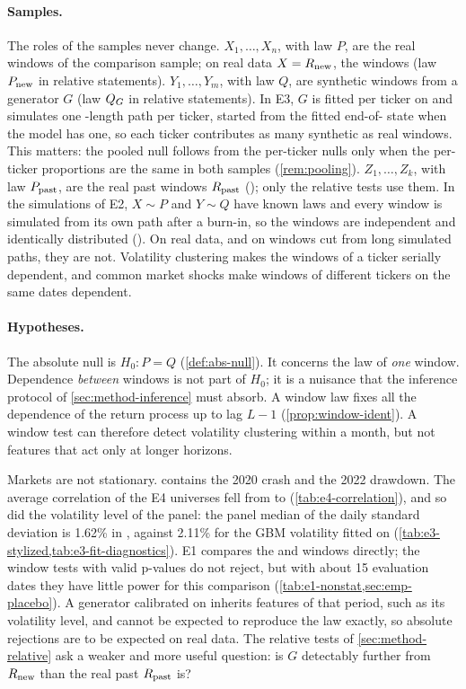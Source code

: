 \paragraph{Samples.}
The roles of the samples never change. $X_1,\dots,X_n$, with law $P$, are the real windows of
the comparison sample; on real data $X=R_{\mathrm{new}}$, the \TEST{} windows (law $P_{\mathrm{new}}$ in relative
statements). $Y_1,\dots,Y_m$, with law $Q$, are synthetic windows from a generator $G$ (law $Q_{G}$
in relative statements). In E3, $G$ is fitted per ticker on \TRAIN{} and simulates one
\TEST{}-length path per ticker, started from the fitted end-of-\TRAIN{} state when the model has
one, so each ticker contributes as many synthetic as real windows. This matters: the pooled null
follows from the per-ticker nulls only when the per-ticker proportions are the same in both
samples (\cref{rem:pooling}). $Z_1,\dots,Z_k$, with law $P_{\mathrm{past}}$, are the real past windows
$R_{\mathrm{past}}$ (\TRAIN{}); only the relative tests use them.
In the simulations of E2, $X\sim P$ and $Y\sim Q$ have known laws and every window is simulated
from its own path after a burn-in, so the windows are independent and identically distributed
(\iid{}). On real data, and on windows cut from long simulated paths, they are not. Volatility
clustering makes the windows of a ticker serially dependent, and common market shocks make
windows of different tickers on the same dates dependent.

\paragraph{Hypotheses.}
The absolute null is $H_0: P=Q$ (\cref{def:abs-null}). It concerns the law of \emph{one}
window. Dependence \emph{between} windows is not part of $H_0$; it is a nuisance that the
inference protocol of \cref{sec:method-inference} must absorb. A window law fixes all the
dependence of the return process up to lag $L-1$ (\cref{prop:window-ident}). A window test can
therefore detect volatility clustering within a month, but not features that act only at longer
horizons.

Markets are not stationary. \TRAIN{} contains the 2020 crash and the 2022 drawdown. The average
correlation of the E4 universes fell from \TRAIN{} to \TEST{} (\cref{tab:e4-correlation}), and
so did the volatility level of the panel: the panel median of the daily standard deviation is
1.62\% in \TEST{}, against 2.11\% for the GBM volatility fitted on \TRAIN{}
(\cref{tab:e3-stylized,tab:e3-fit-diagnostics}). E1 compares the \TRAIN{} and \TEST{} windows
directly; the window tests with valid p-values do not reject, but with about 15 \TEST{} evaluation
dates they have little power for this comparison (\cref{tab:e1-nonstat,sec:emp-placebo}). A generator calibrated on \TRAIN{} inherits features of that period,
such as its volatility level, and cannot be expected to reproduce the \TEST{} law exactly, so
absolute rejections are to be expected on real data. The relative tests of
\cref{sec:method-relative} ask a weaker and more useful question: is $G$ detectably
further from $R_{\mathrm{new}}$ than the real past $R_{\mathrm{past}}$ is?

